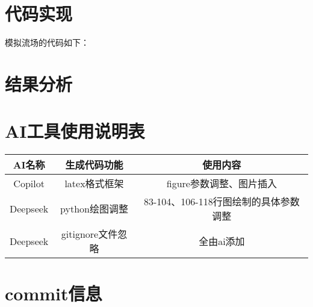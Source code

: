 \documentclass[12pt,a4paper]{article}
\begin{document}
\section{代码实现}
模拟流场的代码如下：

\newpage   
\section{结果分析}


\section{AI工具使用说明表}
\begin{table}[!htbp]
    \centering
    \begin{tabular}{|c|c|c|}
        \hline
        \textbf{AI名称} & \textbf{生成代码功能} & \textbf{使用内容} \\
        \hline
        Copilot & latex格式框架 & figure参数调整、图片插入\\
        \hline
        Deepseek & python绘图调整 & 83-104、106-118行图绘制的具体参数调整\\
        \hline
        Deepseek & gitignore文件忽略 & 全由ai添加\\
        \hline
\end{tabular}
\end{table}
\section{commit信息}
\end{document}
